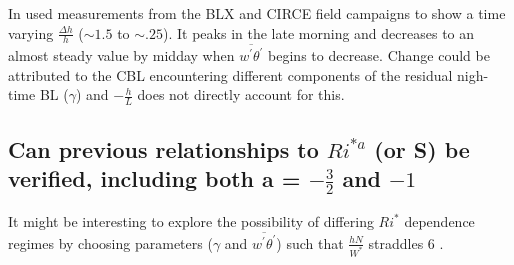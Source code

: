 In \cite{StullNelEl} \citeauthor{StullNelEl} used measurements from the BLX and CIRCE field campaigns 
to show a time varying $\frac{\Delta h}{h}$ ($\sim1.5$ to $\sim .25$).  It peaks in the late morning
and decreases to an almost steady value by midday when $\overline{w^{'}\theta^{'}}$ begins to decrease. Change could be attributed to the CBL encountering different components of the residual nigh-time BL ($\gamma$) and  $-\frac{h}{L}$ does not directly account for this.      

\subsection{Can previous relationships to $Ri^{*a}$ (or S) be verified, including both a = $-\frac{3}{2}$ and $-1$}

It might be interesting to explore the possibility of differing $Ri^{*}$ dependence regimes by choosing parameters 
($\gamma$ and $\overline{w^{'}\theta^{'}}$) such that $\frac{hN}{W^{*}}$ straddles 6 \cite{Turner86}. 

\endinput

Any text after an \endinput is ignored.
You could put scraps here or things in progress.



